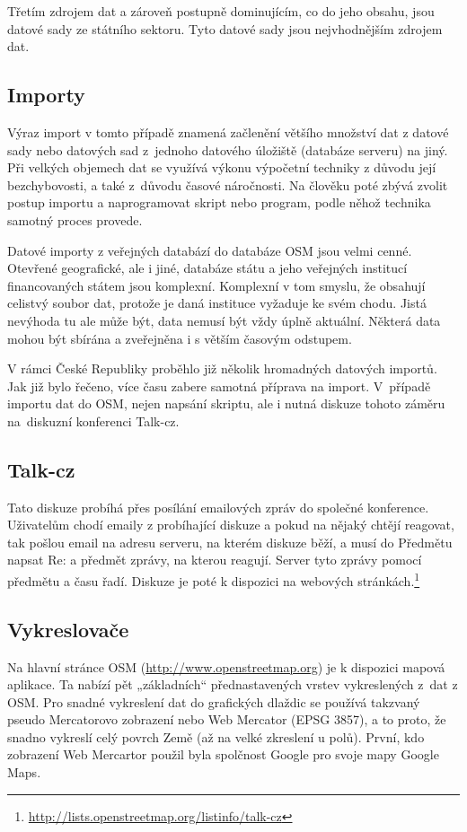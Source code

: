 Třetím zdrojem dat a zároveň postupně dominujícím, co do jeho obsahu, jsou
datové sady ze státního sektoru. Tyto datové sady jsou nejvhodnějším zdrojem
dat.

\subsection{Importy}
\label{Importy}
Výraz import v tomto případě znamená začlenění většího množství dat z datové sady nebo datových sad
z~jednoho datového úložiště (databáze serveru) na jiný. Při velkých objemech dat
se využívá výkonu výpočetní techniky z důvodu její bezchybovosti, a také
z~důvodu časové náročnosti. Na člověku poté zbývá zvolit postup importu
a naprogramovat skript nebo program, podle něhož technika samotný proces
provede. 

Datové importy z veřejných databází do databáze OSM jsou velmi cenné. 
Otevřené geografické, ale i jiné, databáze státu a jeho veřejných institucí 
financovaných státem jsou komplexní. Komplexní v tom smyslu, že obsahují celistvý
soubor dat, protože je daná instituce vyžaduje ke svém chodu. Jistá nevýhoda tu 
ale může být, data nemusí být vždy úplně aktuální. Některá data mohou 
být sbírána a zveřejněna i s větším časovým odstupem.

V rámci České Republiky proběhlo již několik hromadných datových importů. Jak 
již bylo řečeno, více času zabere samotná příprava na import.
V~případě importu dat do OSM, nejen napsání skriptu, ale i nutná diskuze tohoto záměru
na~diskuzní konferenci Talk-cz. 

\subsection{Talk-cz}
\label{Talk-cz}
Tato diskuze probíhá přes posílání emailových zpráv do společné konference. 
Uživatelům chodí emaily z probíhající diskuze a pokud na nějaký chtějí reagovat,
tak pošlou email na adresu serveru, na kterém diskuze běží, a musí do Předmětu 
napsat Re: a předmět zprávy, na kterou reagují. Server tyto zprávy pomocí 
předmětu a času řadí. Diskuze je poté k dispozici na webových stránkách.\footnote{\url{http://lists.openstreetmap.org/listinfo/talk-cz}}

\subsection{Vykreslovače}
\label{Vykreslovače}
Na hlavní stránce OSM (\url{http://www.openstreetmap.org}) je k dispozici mapová aplikace. Ta nabízí pět
„základních“ přednastavených vrstev vykreslených z~dat z OSM.
Pro snadné vykreslení dat do grafických dlaždic se používá takzvaný pseudo Mercatorovo
zobrazení nebo Web Mercator (EPSG 3857), a to proto, že snadno vykreslí celý povrch Země (až na velké zkreslení u polů). 
První, kdo zobrazení Web Mercartor použil byla spolčnost Google pro svoje mapy Google Maps.\cite{WebMercator}

